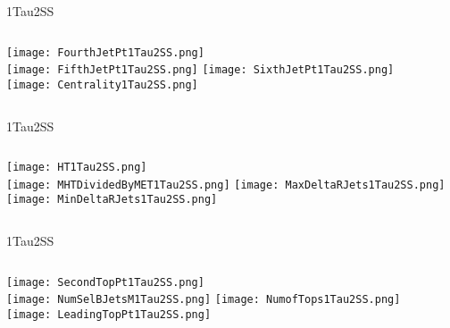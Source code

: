 \documentclass{beamer}
\begin{document}
\begin{frame}{1Tau2SS}
    \begin{columns}[t]
    \centering
    \texttt{[image: FourthJetPt1Tau2SS.png]}\\
    \texttt{[image: FifthJetPt1Tau2SS.png]}
    \centering
    \texttt{[image: SixthJetPt1Tau2SS.png]}\\
    \texttt{[image: Centrality1Tau2SS.png]}
    \end{columns}
\end{frame}
\begin{frame}{1Tau2SS}
    \begin{columns}[t]
    \centering
    \texttt{[image: HT1Tau2SS.png]}\\
    \texttt{[image: MHTDividedByMET1Tau2SS.png]}
    \centering
    \texttt{[image: MaxDeltaRJets1Tau2SS.png]}\\
    \texttt{[image: MinDeltaRJets1Tau2SS.png]}
    \end{columns}
\end{frame}
\begin{frame}{1Tau2SS}
    \begin{columns}[t]
    \centering
    \texttt{[image: SecondTopPt1Tau2SS.png]}\\
    \texttt{[image: NumSelBJetsM1Tau2SS.png]}
    \centering
    \texttt{[image: NumofTops1Tau2SS.png]}\\
    \texttt{[image: LeadingTopPt1Tau2SS.png]}
    \end{columns}
\end{frame}
\end{document}
